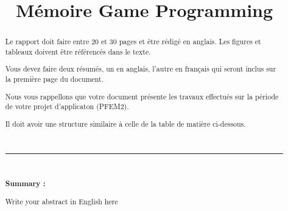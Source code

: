 \documentclass{rapportcs}
\title{Mémoire Game Programming}
\begin{document}




    




    \fairemarges %
    \fairepagedegarde %
    
    \begin{center}
        \begin{abstract}

            Le rapport doit faire entre 20 et 30 pages et être rédigé en anglais. Les figures et tableaux doivent être référencés dans le texte.

            Vous devez faire deux résumés, un en anglais, l'autre en français qui seront inclus sur la première page du document.

            Nous vous rappellons que votre document présente les travaux effectués sur la période de votre projet d'applicaton (PFEM2).

            Il doit avoir une structure similaire à celle de la table de matière ci-dessous.

            \\
            \rule{\linewidth}{0.2 mm} \\[0.4 cm]
            \begin{center}\textbf{Summary :}\end{center}

            Write your abstract in English here


        \end{abstract}
    \end{center}
    \newpage
\end{document}
